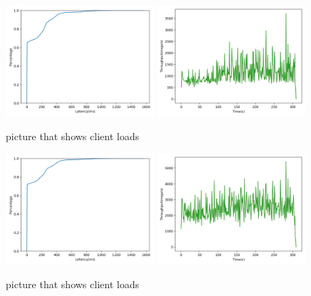 \begin{figure}[!htb]
  \centering
  \includegraphics[width=0.49\textwidth,height=\textheight,keepaspectratio]{img/local5_lat.png}
  \includegraphics[width=0.49\textwidth,height=\textheight,keepaspectratio]{img/local5_tp.png}
  \caption{ picture that shows client loads }
  \label{fig:local5-performance}
\end{figure}

\begin{figure}[!htb]
  \centering
  \includegraphics[width=0.49\textwidth,height=\textheight,keepaspectratio]{img/local1_lat.png}
  \includegraphics[width=0.49\textwidth,height=\textheight,keepaspectratio]{img/local1_tp.png}
  \caption{ picture that shows client loads }
  \label{fig:local1-performance}
\end{figure}

